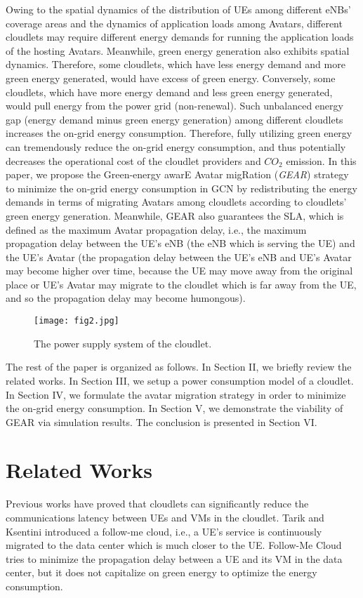 \documentclass[journal,12pt,draftclsnofoot,onecolumn]{IEEEtran}
\begin{document}
Owing to the spatial dynamics of the distribution of UEs among different eNBs' coverage areas and the dynamics of application loads among Avatars, different cloudlets may require different energy demands for running the application loads of the hosting Avatars. Meanwhile, green energy generation also exhibits spatial dynamics. Therefore, some cloudlets, which have less energy demand and more green energy generated, would have excess of green energy. Conversely, some cloudlets, which have more energy demand and less green energy generated, would pull energy from the power grid (non-renewal). Such unbalanced energy gap (energy demand minus green energy generation) among different cloudlets increases the on-grid energy consumption. Therefore, fully utilizing green energy can tremendously reduce the on-grid energy consumption, and thus potentially decreases the operational cost of the cloudlet providers and $CO_{2}$ emission. In this paper, we propose the Green-energy awarE Avatar migRation (\emph{GEAR}) strategy to minimize the on-grid energy consumption in GCN by redistributing the energy demands in terms of migrating Avatars among cloudlets according to cloudlets' green energy generation. Meanwhile, GEAR also guarantees the SLA, which is defined as the maximum Avatar propagation delay, i.e., the maximum propagation delay between the UE's eNB (the eNB which is serving the UE) and the UE's Avatar (the propagation delay between the UE's eNB and UE's Avatar may become higher over time, because the UE may move away from the original place or UE's Avatar may migrate to the cloudlet which is far away from the UE, and so the propagation delay may become humongous).\

\begin{figure}[!htb]
	\centering	
\texttt{[image: fig2.jpg]}
	\caption{The power supply system of the cloudlet.}
	
	\label{fig2}
\end{figure}

The rest of the paper is organized as follows. In Section II, we briefly review the related works. In Section III, we setup a power consumption model of a cloudlet. In Section IV, we formulate the avatar migration strategy in order to minimize the on-grid energy consumption. In Section V, we demonstrate the viability of GEAR via simulation results. The conclusion is presented in Section VI. 

\section{Related Works}
Previous works \cite{1}\cite{6} have proved that cloudlets can significantly reduce the communications latency between UEs and VMs in the cloudlet. Tarik and Ksentini \cite{7} introduced a follow-me cloud, i.e., a UE's service is continuously migrated to the data center which is much closer to the UE. Follow-Me Cloud tries to minimize the propagation delay between a UE and its VM in the data center, but it does not capitalize on green energy to optimize the energy consumption. \
\end{document}
